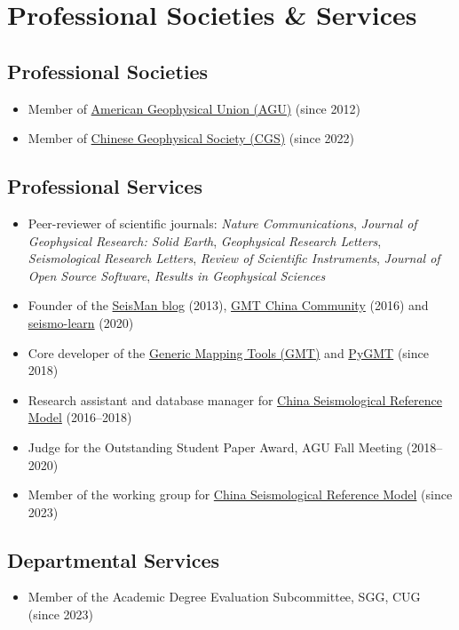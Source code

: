 \section{Professional Societies \& Services}

\subsection{Professional Societies}
\begin{itemize}
\item Member of \href{https://sites.agu.org/}{American Geophysical Union (AGU)} (since 2012)
\item Member of \href{http://www.cgscgs.org.cn/}{Chinese Geophysical Society (CGS)} (since 2022)
\end{itemize}

\subsection{Professional Services}
\begin{itemize}
\item Peer-reviewer of scientific journals:
      \emph{Nature Communications},
      \emph{Journal of Geophysical Research: Solid Earth},
      \emph{Geophysical Research Letters},
      \emph{Seismological Research Letters},
      \emph{Review of Scientific Instruments},
      \emph{Journal of Open Source Software},
      \emph{Results in Geophysical Sciences}
\item Founder of the \href{https://blog.seisman.info}{SeisMan blog} (2013),
      \href{http://gmt-china.org/}{GMT China Community} (2016)
      and \href{https://seismo-learn.org/}{seismo-learn} (2020)
\item Core developer of the \href{https://github.com/GenericMappingTools/gmt}{Generic Mapping Tools (GMT)} and
      \href{https://github.com/GenericMappingTools/pygmt}{PyGMT} (since 2018)
\item Research assistant and database manager for \href{http://chinageorefmodel.org/}{China Seismological Reference Model} (2016--2018)
\item Judge for the Outstanding Student Paper Award, AGU Fall Meeting (2018--2020)
\item Member of the working group for \href{http://chinageorefmodel.org/}{China Seismological Reference Model} (since 2023)
\end{itemize}

\subsection{Departmental Services}
\begin{itemize}
\item Member of the Academic Degree Evaluation Subcommittee, SGG, CUG (since 2023)
\end{itemize}
